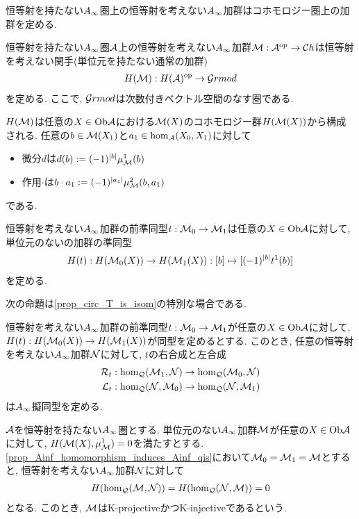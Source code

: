 \documentclass[uplatex, a4paper, 14Q, dvipdfmx]{jsarticle}
\begin{document}
恒等射を持たない$A_{\infty}$圏上の恒等射を考えない$A_{\infty}$加群はコホモロジー圏上の加群を定める. 

\begin{remark}
  恒等射を持たない$A_{\infty}$圏$\mathcal{A}$上の恒等射を考えない$A_{\infty}$加群$\mathcal{M} : \mathcal{A}^\mathrm{op} \to \mathcal{C} h$は恒等射を考えない関手(単位元を持たない通常の加群) 
  \begin{align*}
    H(\mathcal{M}) : H(\mathcal{A})^{\mathrm{op}} \to \mathcal{G} rmod
  \end{align*}
  を定める. 
  ここで, $\mathcal{G} rmod$は次数付きベクトル空間のなす圏である. 
\end{remark}

\begin{remark}
  $H(\mathcal{M})$は任意の$X \in \mathrm{Ob}\mathcal{A}$における$\mathcal{M}(X)$のコホモロジー群$H(\mathcal{M}(X))$から構成される. 
  任意の$b \in \mathcal{M}(X_1)$と$a_1 \in \hom_{\mathcal{A}}(X_0,X_1)$に対して
  \begin{itemize}
    \item 微分$d$は$d(b) := (-1)^{|b|} \mu^1_{\mathcal{M}}(b)$
    \item 作用$\cdot$は$b \cdot a_1 := (-1)^{|a_1|} \mu^2_{\mathcal{M}}(b,a_1)$
  \end{itemize}
  である. 
\end{remark}

\begin{remark}
  恒等射を考えない$A_{\infty}$加群の前準同型$t : \mathcal{M}_0 \to \mathcal{M}_1$は任意の$X \in \mathrm{Ob}\mathcal{A}$に対して, 単位元のないの加群の準同型
  \begin{align*}
    H(t) : H(\mathcal{M}_0(X)) \to H(\mathcal{M}_1(X)) : [b] \mapsto [(-1)^{|b|} t^1(b)]
  \end{align*}
  を定める. 
\end{remark}

次の命題は\cref{prop_circ_T_is_isom}の特別な場合である. 

\begin{corollary} \label{prop_Ainf_homomorphism_induces_Ainf_qis}
  恒等射を考えない$A_{\infty}$加群の前準同型$t : \mathcal{M}_0 \to \mathcal{M}_1$が任意の$X \in \mathrm{Ob}\mathcal{A}$に対して, $ H(t) : H(\mathcal{M}_0(X)) \to H(\mathcal{M}_1(X))$が同型を定めるとする.
  このとき, 任意の恒等射を考えない$A_{\infty}$加群$\mathcal{N}$に対して, $t$の右合成と左合成
  \begin{align*}
    \mathcal{R}_t &: \hom_{\mathcal{Q}}(\mathcal{M}_1,\mathcal{N}) \to \hom_{\mathcal{Q}}(\mathcal{M}_0,\mathcal{N}) \\
    \mathcal{L}_t &: \hom_{\mathcal{Q}}(\mathcal{N},\mathcal{M}_0) \to \hom_{\mathcal{Q}}(\mathcal{N},\mathcal{M}_1)
  \end{align*} 
  は$A_{\infty}$擬同型を定める. 
\end{corollary}

\begin{remark}
  $\mathcal{A}$を恒等射を持たない$A_{\infty}$圏とする.
  単位元のない$A_{\infty}$加群$\mathcal{M}$が任意の$X \in \mathrm{Ob}\mathcal{A}$に対して, $H(\mathcal{M}(X),\mu^1_{\mathcal{M}}) = 0$を満たすとする. 
  \cref{prop_Ainf_homomorphism_induces_Ainf_qis}において$\mathcal{M}_0=\mathcal{M}_1=\mathcal{M}$とすると, 恒等射を考えない$A_{\infty}$加群$\mathcal{N}$に対して
  \begin{align*}
    H(\hom_{\mathcal{Q}}(\mathcal{M},\mathcal{N})) = H(\hom_{\mathcal{Q}}(\mathcal{N},\mathcal{M})) = 0
  \end{align*}
  となる. 
  このとき, $\mathcal{M}$はK-projectiveかつK-injectiveであるという. 
\end{remark}
\end{document}
